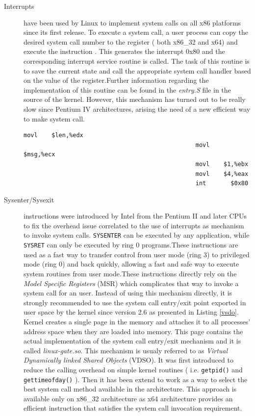 \begin{description}

\item[Interrupts] have been used by Linux to implement system calls on all x86 platforms since its first release. To execute a system call, a user process can copy the desired system call number to the  register ( both x86\_32 and x64) and execute the instruction . This generates the interrupt 0x80 and the corresponding interrupt service routine is called. The task of this routine is to save the current state and call the appropriate system call handler based on the value of the  register.Further information regarding the implementation of this routine can be found in the \emph{entry.S} file in the source of the kernel. However, this mechanism has turned out to be really slow since Pentium IV architectures, arising the need of a new efficient way to make system call. 


\begin{center}
\lstset{escapechar=@,style=asm}
\begin{lstlisting}[label=list:int,caption=Write system call invocation via interrupt on x86\_32 architecture]
  											     movl    $len,%edx       
  							  					 movl    $msg,%ecx       
       				 							 movl    $1,%ebx        
       				 			 				 movl    $4,%eax         
      							 				 int 	   $0x80
\end{lstlisting}
\end{center}




\item[Sysenter/Sysexit] instructions were introduced by Intel from the Pentium II and later CPUs to fix the overhead issue correlated to the use of interrupts as mechanism to invoke system calls. \lstinline$SYSENTER$ can be executed by any application, while  \lstinline$SYSRET$ can only be executed by ring 0 programs.These instructions are used as a fast way to transfer control from user mode (ring 3) to privileged mode (ring 0) and back quickly, allowing a fast and safe way to execute system routines from user mode.These instructions directly rely on the \textit{Model Specific Registers} (MSR) \cite{Intel} which complicates that way to invoke a system call for an user. Instead of using this mechanism directly, it is strongly recommended to use the system call entry/exit point exported in user space by the kernel since version 2.6 as presented in Listing \ref{vsdo}. Kernel creates a single page in the memory and attaches it to all processes' address space when they are loaded into memory. This page contains the actual implementation of the system call entry/exit mechanism and it is called \emph{linux-gate.so}. This mechanism is usualy referred to as  \textit{Virtual Dynamically linked Shared Objects} (VDSO). It was first introduced to reduce the calling overhead on simple kernel routines ( i.e. \lstinline$getpid()$ and \lstinline$gettimeofday()$ ). Then it has been extend to work as a way to select the best system call method available in the architecture. This approach is available only on x86\_32 architecture as x64 architecture  provides an efficient instruction that satisfies the system call invocation requirement.  



\end{description}
